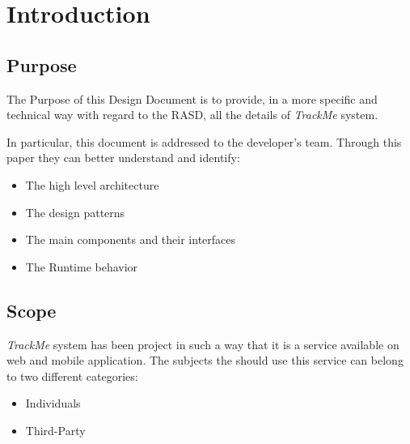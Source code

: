 \documentclass[a4paper]{article}
\begin{document}

\tableofcontents
{}

\newpage
\pagestyle{fancy}

\section{Introduction}

\subsection{Purpose}
    The Purpose of this Design Document is to provide, in a more specific and technical way with regard to the RASD, all the details of \textit{TrackMe} system.
    
    In particular, this document is addressed to the developer's team. Through this paper they can better understand and identify:
    \newline
    \begin{itemize}
    
 \item{The high level architecture}
 
 \item{The design patterns}
 
 \item{The main components and their interfaces}
 
 \item{The Runtime behavior}
 
    \end{itemize}
    

    \newpage
    
    \subsection{Scope}
    \textit{TrackMe} system has been project in such a way that it is a service available on web and mobile application. The subjects the should use this service can belong to two different categories:
    \newline
    \begin{itemize}
    
    \item{Individuals}
    
    \item{Third-Party}
    \newline
    \end{itemize}
    
\end{document}
